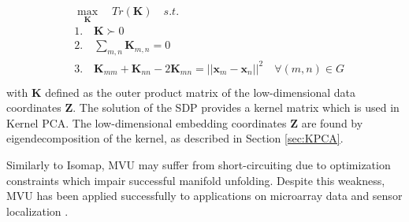 \begin{align}
	\begin{split}
		&\max_{\bm{K}} \quad Tr(\bm{K}) \quad s.t.\\
		&1. \quad \bm{K} \succ 0\\
		&2. \quad \sum_{m,n} \bm{K}_{m,n}=0\\
		&3. \quad \bm{K}_{mm} + \bm{K}_{nn} - 2\bm{K}_{mn} = ||\bm{x}_{m} - \bm{x}_{n} ||^{2} \quad \forall (m,n) \in G\\
	\end{split}
\end{align}
\noindent
with $\bm{K}$ defined as the outer product matrix of the low-dimensional data coordinates $\bm{Z}$.  The solution of the SDP provides a kernel matrix which is used in Kernel PCA.  The low-dimensional embedding coordinates $\bm{Z}$ are found by eigendecomposition of the kernel, as described in Section \ref{sec:KPCA}. 


Similarly to Isomap, MVU may suffer from short-circuiting due to optimization constraints which impair successful manifold unfolding.  Despite this weakness, MVU has been applied successfully to applications on microarray data and sensor localization \citep{VanDerMaaten2009DRReview}.


